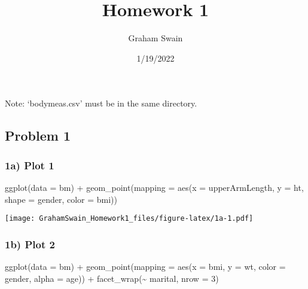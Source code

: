 \documentclass[
]{article}
\title{Homework 1}
\author{Graham Swain}
\date{1/19/2022}
\newenvironment{Shaded}{\begin{snugshade}}{\end{snugshade}}
\newcommand{\AttributeTok}[1]{\textcolor[rgb]{0.77,0.63,0.00}{#1}}
\newcommand{\DecValTok}[1]{\textcolor[rgb]{0.00,0.00,0.81}{#1}}
\newcommand{\FunctionTok}[1]{\textcolor[rgb]{0.00,0.00,0.00}{#1}}
\newcommand{\NormalTok}[1]{#1}
\newcommand{\SpecialCharTok}[1]{\textcolor[rgb]{0.00,0.00,0.00}{#1}}
\begin{document}
\maketitle

Note: `bodymeas.csv' must be in the same directory.

\hypertarget{problem-1}{%
\subsection{Problem 1}\label{problem-1}}

\hypertarget{a-plot-1}{%
\subsubsection{1a) Plot 1}\label{a-plot-1}}

\begin{Shaded}
\begin{Highlighting}[]
\FunctionTok{ggplot}\NormalTok{(}\AttributeTok{data =}\NormalTok{ bm) }\SpecialCharTok{+}
  \FunctionTok{geom\_point}\NormalTok{(}\AttributeTok{mapping =} \FunctionTok{aes}\NormalTok{(}\AttributeTok{x =}\NormalTok{ upperArmLength, }\AttributeTok{y =}\NormalTok{ ht, }\AttributeTok{shape =}\NormalTok{ gender, }\AttributeTok{color =}\NormalTok{ bmi))}
\end{Highlighting}
\end{Shaded}

\texttt{[image: GrahamSwain\_Homework1\_files/figure-latex/1a-1.pdf]}

\hypertarget{b-plot-2}{%
\subsubsection{1b) Plot 2}\label{b-plot-2}}

\begin{Shaded}
\begin{Highlighting}[]
\FunctionTok{ggplot}\NormalTok{(}\AttributeTok{data =}\NormalTok{ bm) }\SpecialCharTok{+}
  \FunctionTok{geom\_point}\NormalTok{(}\AttributeTok{mapping =} \FunctionTok{aes}\NormalTok{(}\AttributeTok{x =}\NormalTok{ bmi, }\AttributeTok{y =}\NormalTok{ wt, }\AttributeTok{color =}\NormalTok{ gender, }\AttributeTok{alpha =}\NormalTok{ age)) }\SpecialCharTok{+}
  \FunctionTok{facet\_wrap}\NormalTok{(}\SpecialCharTok{\textasciitilde{}}\NormalTok{ marital, }\AttributeTok{nrow =} \DecValTok{3}\NormalTok{)}
\end{Highlighting}
\end{Shaded}
\end{document}

